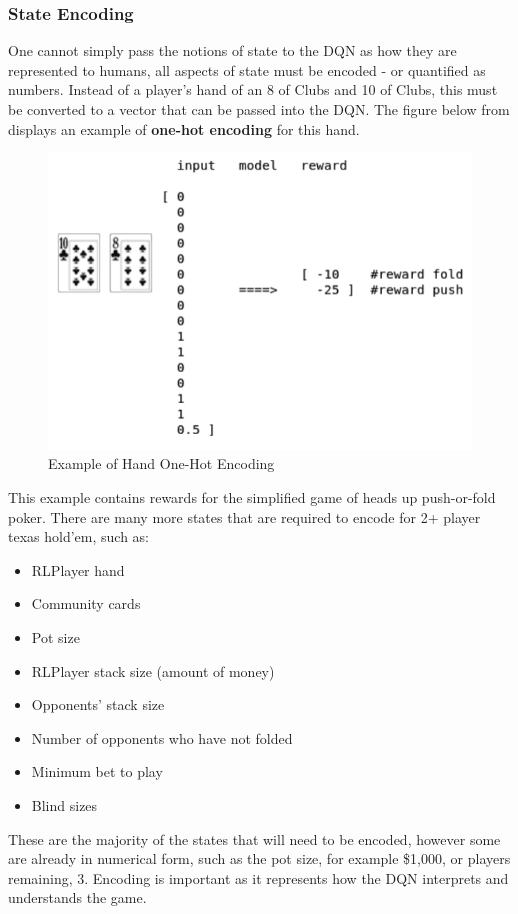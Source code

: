 \documentclass[12pt]{article}
\begin{document}
\subsubsection{State Encoding}
One cannot simply pass the notions of state to the DQN as how they are represented to humans, all aspects of state must be encoded - or quantified as numbers. Instead of a player's hand of an 8 of Clubs and 10 of Clubs, this must be converted to a vector that can be passed into the DQN. The figure below from \cite{q} displays an example of \textbf{one-hot encoding} for this hand.
\begin{figure}[H]
    \centering
    \includegraphics[width=.50\linewidth]{figures/enc}
    \caption{Example of Hand One-Hot Encoding \cite{q}}
    \label{fig:enc}
\end{figure}
This example contains rewards for the simplified game of heads up push-or-fold poker. There are many more states that are required to encode for 2+ player texas hold'em, such as:
\begin{itemize}
	\item RLPlayer hand
	\item Community cards
	\item Pot size
	\item RLPlayer stack size (amount of money)
	\item Opponents' stack size
	\item Number of opponents who have not folded
	\item Minimum bet to play
	\item Blind sizes
\end{itemize}
These are the majority of the states that will need to be encoded, however some are already in numerical form, such as the pot size, for example \$1,000, or players remaining, 3. Encoding is important as it represents how the DQN interprets and understands the game.
\end{document}
